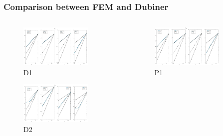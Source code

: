 \documentclass[9pt]{beamer}
\begin{document}
\begin{frame}
\frametitle{Comparison between FEM and Dubiner}
\begin{columns}
	\begin{column}{0.5\textwidth}
	\begin{figure}[h]
	\includegraphics[width=0.8\textwidth]{D1_Vm_1.jpg} \caption{D1}
	\end{figure}
    \vspace{-4mm}
    \begin{figure}[h]
	\includegraphics[width=0.8\textwidth]{D2_Vm_1.jpg} \caption{D2}
	\end{figure}
    \end{column}
    \begin{column}{0.5\textwidth}
    \begin{figure}[h]
	\includegraphics[width=0.8\textwidth]{P1_Vm_1.jpg} \caption{P1}

\end{figure}
\end{column}
\end{columns}
\end{frame}
\end{document}
